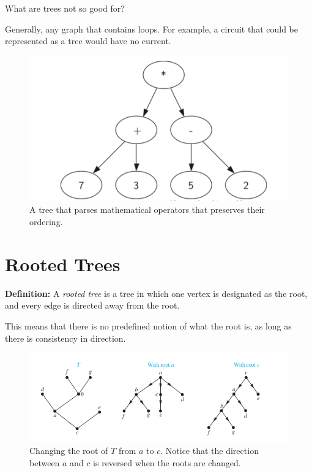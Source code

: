 \documentclass[a4paper,10pt]{report}
\begin{document}
What are trees not so good for?

Generally, any graph that contains loops. For example, a circuit that could be represented as a tree would have no current.

\begin{figure}[h!]
	\begin{centering}
	\begin{center}
	\includegraphics[width=\linewidth]{./parse_tree.png}
	\caption{A tree that parses mathematical operators that preserves their ordering.}
	\label{fig:parse}
	\end{center}
	\par\end{centering}
\end{figure}





\chapter{Rooted Trees}
\textbf{Definition:} A \textit{rooted tree} is a tree in which one vertex is designated as the root, and every edge is directed away from the root.

This means that there is no predefined notion of what the root is, as long as there is consistency in direction.
\begin{figure}[h!]
	\begin{centering}
	\begin{center}
	\includegraphics[width=\linewidth]{./changing_roots.png}
	\caption{Changing the root of $T$ from $a$ to $c$. Notice that the direction between $a$ and $c$ is reversed when the roots are changed.}
	\label{fig:changing_roots}
	\end{center}
	\par\end{centering}
\end{figure}
\end{document}
